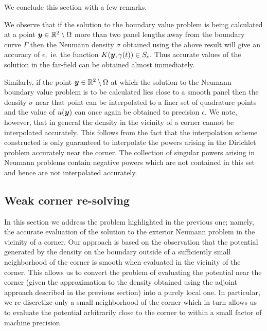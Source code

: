 We conclude this section with a few remarks. 

\begin{remark1}
We observe that if the solution to the boundary value problem is being calculated at a point $\boldsymbol{y} \in \mathbb{R}^2\setminus \Omega$ more than {\color{red}two panel lengths} away from the boundary curve $\Gamma$ then the Neumann density $\sigma$ obtained using the above result will give an accuracy of $\epsilon,$ ie. the function $K(\boldsymbol{y},\gamma(t)) \in S_\epsilon.$ Thus accurate values of the solution in the far-field can be obtained almost immediately.
\end{remark1}
\begin{remark1}
Similarly, if the point $\boldsymbol{y} \in \mathbb{R}^2 \setminus \Omega$ at which the solution to the Neumann boundary value problem is to be calculated lies close to a smooth panel then the density $\sigma$ near that point can be interpolated to a finer set of quadrature points and the value of $u(\boldsymbol{y})$ can once again be obtained to precision $\epsilon.$ We note, however, that in general the density in the vicinity of a corner cannot be interpolated accurately. This follows from the fact that the interpolation scheme constructed is only guaranteed to interpolate the powers arising in the Dirichlet problem accurately near the corner. The collection of singular powers arising in Neumann problems contain negative powers which are not contained in this set and hence are not interpolated accurately.
\end{remark1}

\subsection{Weak corner re-solving}
In this section we address the problem highlighted in the previous one; namely, the accurate evaluation of the solution to the exterior Neumann problem in the vicinity of a corner. Our approach is based on the observation that the potential generated by the density on the boundary outside of a sufficiently small neighborhood of the corner is smooth when evaluated in the vicinity of the corner. This allows us to convert the problem of evaluating the potential near the corner (given the approximation to the density obtained using the adjoint approach described in the previous section) into a purely local one. In particular, we re-discretize only a small neighborhood of the corner which in turn allows us to evaluate the potential arbitrarily close to the corner to within a small factor of machine precision. 

